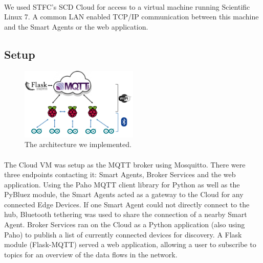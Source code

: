 \paragraph{}
We used STFC's SCD Cloud for access to a virtual machine running Scientific Linux 7. A common LAN enabled TCP/IP communication between this machine and the Smart Agents or the web application.


\subsection{Setup}

\begin{figure}
    \centering
    \includegraphics[width=0.5\textwidth]{Architecture.png}
    \caption{The architecture we implemented.}
    \label{fig:architecture}
\end{figure}

\paragraph{}
The Cloud VM was setup as the MQTT broker using Mosquitto. There were three endpoints contacting it: Smart Agents, Broker Services and the web application. Using the Paho MQTT client library for Python as well as the PyBluez module, the Smart Agents acted as a gateway to the Cloud for any connected Edge Devices. If one Smart Agent could not directly connect to the hub, Bluetooth tethering was used to share the connection of a nearby Smart Agent. Broker Services ran on the Cloud as a Python application (also using Paho) to publish a list of currently connected devices for discovery. A Flask module (Flask-MQTT) served a web application, allowing a user to subscribe to topics for an overview of the data flows in the network.

